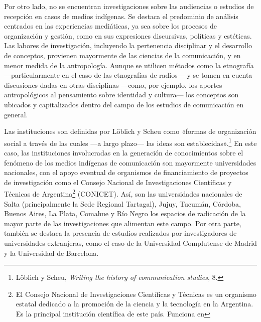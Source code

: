 \documentclass{tufte-handout}
\begin{document}
Por otro lado, no se encuentran investigaciones sobre las audiencias o
estudios de recepción en casos de medios indígenas. Se destaca el
predominio de análisis centrados en las experiencias mediáticas, ya sea
sobre los procesos de organización y gestión, como en sus expresiones
discursivas, políticas y estéticas. Las labores de investigación,
incluyendo la pertenencia disciplinar y el desarrollo de conceptos,
provienen mayormente de las ciencias de la comunicación, y en menor
medida de la antropología. Aunque se utilicen métodos como la etnografía
---particularmente en el caso de las etnografías de radios--- y se tomen
en cuenta discusiones dadas en otras disciplinas ---como, por ejemplo,
los aportes antropológicos al pensamiento sobre identidad y cultura---
los conceptos son ubicados y capitalizados dentro del campo de los
estudios de comunicación en general.

Las instituciones son definidas por Löblich y Scheu como «formas de
organización social a través de las cuales ---a largo plazo--- las ideas
son establecidas».\footnote{Löblich y Scheu, \emph{Writing the history
  of communication studies}, 8.} En este caso, las instituciones
involucradas en la generación de conocimientos sobre el fenómeno de los
medios indígenas de comunicación son mayormente universidades
nacionales, con el apoyo eventual de organismos de financiamiento de
proyectos de investigación como el Consejo Nacional de Investigaciones
Científicas y Técnicas de Argentina\footnote{El Consejo Nacional de
  Investigaciones Científicas y Técnicas es un organismo estatal
  dedicado a la promoción de la ciencia y la tecnología en la Argentina.
  Es la principal institución científica de este país. Funciona en}
(CONICET). Así, son las universidades nacionales de Salta
(principalmente la Sede Regional Tartagal), Jujuy, Tucumán, Córdoba,
Buenos Aires, La Plata, Comahue y Río Negro los espacios de radicación
de la mayor parte de las investigaciones que alimentan este campo. Por
otra parte, también se destaca la presencia de estudios realizados por
investigadores de universidades extranjeras, como el caso de la
Universidad Complutense de Madrid y la Universidad de Barcelona.
\end{document}
